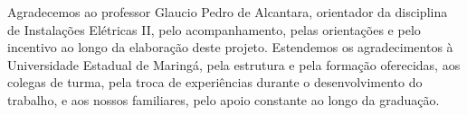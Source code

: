 \documentclass[12pt,openright,oneside,a4paper,brazil]{abntex2}
\begin{document}
\imprimirfolhaderosto




\tableofcontents*
\cleardoublepage


\frontmatter
\pretextual
{}

\begin{agradecimentos}
\hspace{1.27cm} Agradecemos ao professor Glaucio Pedro de Alcantara, orientador da disciplina de Instalações Elétricas II, pelo acompanhamento, pelas orientações e pelo incentivo ao longo da elaboração deste projeto. Estendemos os agradecimentos à Universidade Estadual de Maringá, pela estrutura e pela formação oferecidas, aos colegas de turma, pela troca de experiências durante o desenvolvimento do trabalho, e aos nossos familiares, pelo apoio constante ao longo da graduação.
\end{agradecimentos}
\cleardoublepage

\listoffigures*
\cleardoublepage
\end{document}
